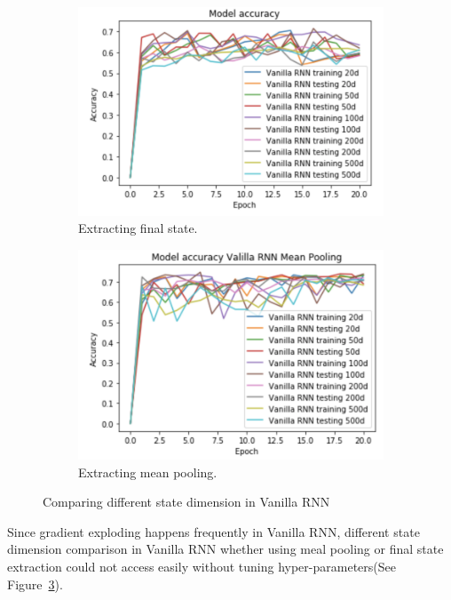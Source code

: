 \documentclass[12pt,letterpaper]{article}
\begin{document}
\begin{figure}[h]
    \begin{subfigure}{0.49\textwidth}
    \includegraphics[width=\linewidth]{different_dim_vanilla_final_state.png}
    \caption{\small Extracting final state.} \label{fig:e}
    \end{subfigure}\hspace*{\fill}
    \begin{subfigure}{0.49\textwidth}
    \includegraphics[width=\linewidth]{different_dim_vanilla_mean_pool.png}
    \caption{\small Extracting mean pooling.} \label{fig:f}
    \end{subfigure}
    \caption{Comparing different state dimension in Vanilla RNN}
    \label{fig:Vanilla_diffe_dim}
\end{figure}

Since gradient exploding happens frequently in Vanilla RNN, different state dimension comparison in Vanilla RNN whether using meal pooling or final state extraction could not access easily without tuning hyper-parameters(See Figure~\ref{fig:Vanilla_diffe_dim}).
\end{document}
